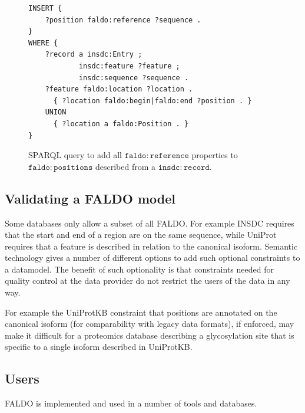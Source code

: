 \begin{figure}
\begin{shaded}
\small
\begin{verbatim}
INSERT {
    ?position faldo:reference ?sequence .
}
WHERE {
    ?record a insdc:Entry ;
            insdc:feature ?feature ;
            insdc:sequence ?sequence .
    ?feature faldo:location ?location .
      { ?location faldo:begin|faldo:end ?position . }
    UNION
      { ?location a faldo:Position . }
}
\end{verbatim}
\end{shaded}
\caption{SPARQL query to add all $\mathtt{faldo\colon{}reference}$ properties to $\mathtt{faldo\colon{}positions}$ described from a $\mathtt{insdc\colon{}record}$.}
\label{sparql:chainProperty}
\end{figure}

\subsection*{Validating a FALDO model}

Some databases only allow a subset of all FALDO. For example
INSDC requires that the start and end of a region are on the same sequence,
while UniProt requires that a feature is described in relation to the canonical isoform.
Semantic technology gives a number of different options\cite{RDFValidationReport} to add 
such optional constraints to a datamodel. 
The benefit of such optionality is that constraints needed for quality control at 
the data provider do not restrict the users of the data in any way. 

For example the UniProtKB constraint that positions are annotated on the canonical isoform 
(for comparability with legacy data formats), if enforced, may make it difficult for a proteomics
database describing a glycosylation site that is specific to a single isoform described in UniProtKB.

\subsection*{Users}
FALDO is implemented and used in a number of tools and databases.

